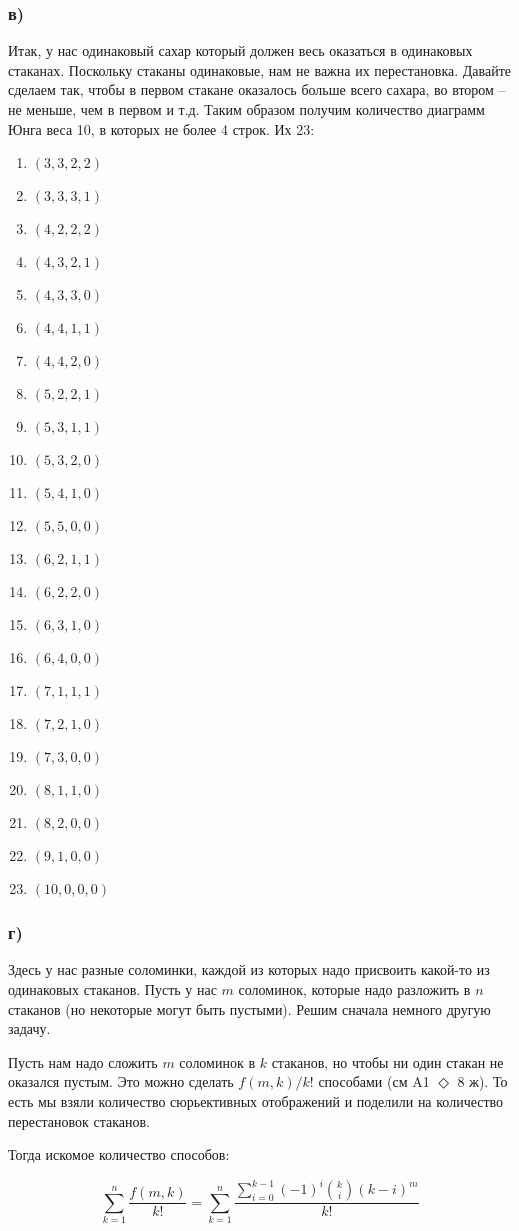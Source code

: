 \documentclass[a4paper]{article}
\begin{document}
  \subsubsection*{в)}
  Итак, у нас одинаковый сахар который должен весь оказаться в одинаковых стаканах. Поскольку стаканы одинаковые, нам не важна их перестановка. Давайте сделаем так, чтобы в первом стакане оказалось больше всего сахара, во втором -- не меньше, чем в первом и т.д. Таким образом получим количество диаграмм Юнга веса 10, в которых не более 4 строк. Их 23:
  \begin{multicols}{4}
  \begin{enumerate}
      \item $(3, 3, 2, 2)$
      \item $(3, 3, 3, 1)$
      \item $(4, 2, 2, 2)$
      \item $(4, 3, 2, 1)$
      \item $(4, 3, 3, 0)$
      \item $(4, 4, 1, 1)$
      \item $(4, 4, 2, 0)$
      \item $(5, 2, 2, 1)$
      \item $(5, 3, 1, 1)$
      \item $(5, 3, 2, 0)$
      \item $(5, 4, 1, 0)$
      \item $(5, 5, 0, 0)$
      \item $(6, 2, 1, 1)$
      \item $(6, 2, 2, 0)$
      \item $(6, 3, 1, 0)$
      \item $(6, 4, 0, 0)$
      \item $(7, 1, 1, 1)$
      \item $(7, 2, 1, 0)$
      \item $(7, 3, 0, 0)$
      \item $(8, 1, 1, 0)$
      \item $(8, 2, 0, 0)$
      \item $(9, 1, 0, 0)$
      \item $(10, 0, 0, 0)$
  \end{enumerate}
  \end{multicols}


  \subsubsection*{г)}
  Здесь у нас разные соломинки, каждой из которых надо присвоить какой-то из одинаковых стаканов. Пусть у нас $m$ соломинок, которые надо разложить в $n$ стаканов (но некоторые могут быть пустыми).
  Решим сначала немного другую задачу.

  Пусть нам надо сложить $m$ соломинок в $k$ стаканов, но чтобы ни один стакан не оказался пустым. Это можно сделать $f(m, k) / k!$ способами (см A1 $\Diamond$ 8 ж). То есть мы взяли количество сюрьективных отображений и поделили на количество перестановок стаканов.

  Тогда искомое количество способов:

  $$\sum_{k = 1}^n \frac{f(m, k)}{k!} = \sum_{k = 1}^n \frac{\sum_{i=0}^{k - 1} (-1)^i \binom{k}{i} (k - i)^m}{k!}$$
\end{document}
